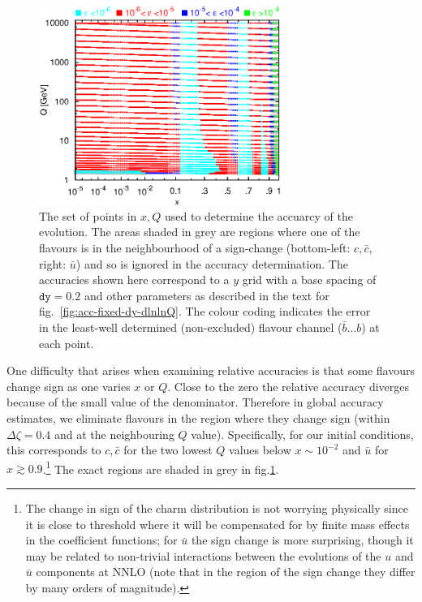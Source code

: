 \documentclass[12pt]{article}
\newcommand{\comment}[1]{\textbf{[#1]}}
\newcommand{\ttt}[1]{\texttt{#1}}
\begin{document}
\begin{figure}
  \centering
  \includegraphics[width=0.7\textwidth]{../benchmarking/test_acc/grid.eps}%
  \caption{The set of points in $x, Q$ used to determine the accuarcy
    of the evolution. The areas shaded in grey are regions where one
    of the flavours is in the neighbourhood of a sign-change
    (bottom-left: $c,\bar c$, right: $\bar u$) and so is ignored in
    the accuracy determination.  The accuracies shown here correspond
    to a $y$ grid with a base spacing of $\ttt{dy}=0.2$ and other
    parameters as described in the text for
    fig.~\ref{fig:acc-fixed-dy-dlnlnQ}.
    The colour coding indicates the error in the least-well determined
    (non-excluded) flavour channel ($\bar b \ldots b$) at each point.
  }
  \label{fig:grid}
\end{figure}


One difficulty that arises when examining relative accuracies is that
some flavours change sign as one varies $x$ or $Q$. Close to the zero
the relative accuracy diverges because of the small value of the
denominator. Therefore in global accuracy estimates, we eliminate
flavours in the region where they change sign (within $\Delta
\zeta=0.4$ and at the neighbouring $Q$ value). Specifically, for our
initial conditions, this corresponds to $c,\bar c$ for the two lowest
$Q$ values below $x\sim 10^{-2}$ and $\bar u$ for $x\gtrsim
0.9$.\footnote{The change in sign of the charm distribution is not
  worrying physically since it is close to threshold where it will be
  compensated for by finite mass effects in the coefficient functions;
  for $\bar u$ the sign change is more surprising, though it may be
  related to non-trivial interactions between the evolutions of the
  $u$ and $\bar u$ components at NNLO (note that in the region of the
  sign change they differ by many orders of magnitude).  } %
The exact regions are shaded in grey in fig.\ref{fig:grid}.
\end{document}
